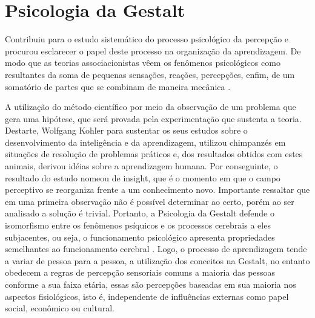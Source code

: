 \newpage
\section{Psicologia da Gestalt}\label{gestalt}


Contribuiu para o estudo sistemático do processo psicológico da percepção e procurou esclarecer o papel deste processo na organização da aprendizagem.
De modo que as teorias associacionistas vêem os fenômenos psicológicos como resultantes da soma de pequenas sensações, reações, percepções, enfim, de um somatório de partes que se combinam de maneira mecânica \cite{silva2007psicologia_educacao}.

A utilização do método científico por meio da observação de um problema que gera uma hipótese, que será provada pela experimentação que sustenta a teoria. 
Destarte, Wolfgang Kohler para sustentar os seus estudos sobre o desenvolvimento da inteligência e da
aprendizagem, utilizou chimpanzés em situações de resolução de problemas práticos e, dos resultados obtidos com estes animais, derivou idéias sobre a aprendizagem humana. 
Por conseguinte, o resultado do estudo nomeou de insight, que é o momento em que o campo perceptivo se reorganiza frente a um conhecimento novo. 
Importante ressaltar que em uma primeira observação não é possível determinar ao certo, porém ao ser analisado a solução é trivial.
Portanto, a Psicologia da Gestalt defende o isomorfismo entre os fenômenos psíquicos e os
processos cerebrais a eles subjacentes, ou seja, o funcionamento psicológico apresenta propriedades semelhantes ao funcionamento cerebral \cite{silva2007psicologia_educacao}. 
Logo, o processo de aprendizagem tende a variar de pessoa para a pessoa, a utilização dos
conceitos na Gestalt, no entanto obedecem a regras de percepção sensoriais comuns a maioria das pessoas conforme a sua faixa etária, essas são percepções baseadas em sua maioria nos aspectos fisiológicos, isto é, independente de influências externas como papel social, econômico ou cultural.
